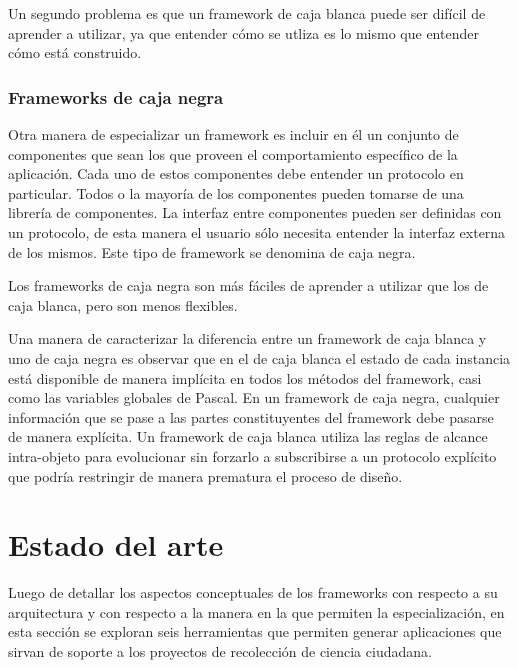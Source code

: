 	Un segundo problema es que un framework de caja blanca puede ser difícil de aprender a utilizar, ya que entender cómo se utliza es lo mismo que entender cómo está construido.\cite{johnson1988designing}
	
\subsubsection{Frameworks de caja negra}

	Otra manera de especializar un framework es incluir en él un conjunto de componentes que sean los que proveen el comportamiento específico de la aplicación. Cada uno de estos componentes debe entender un protocolo en particular. Todos o la mayoría de los componentes pueden tomarse de una librería de componentes. La interfaz entre componentes pueden ser definidas con un protocolo, de esta manera el usuario sólo necesita entender la interfaz externa de los mismos. Este tipo de framework se denomina de caja negra.
	
	Los frameworks de caja negra son más fáciles de aprender a utilizar que los de caja blanca, pero son menos flexibles. 
	
	Una manera de caracterizar la diferencia entre un framework de caja blanca y uno de caja negra es observar que en el de caja blanca el estado de cada instancia está disponible de manera implícita en todos los métodos del framework, casi como las variables globales de Pascal. En un framework de caja negra, cualquier información que se pase a las partes constituyentes del framework debe pasarse de manera explícita. Un framework de caja blanca utiliza las reglas de alcance intra-objeto para evolucionar sin forzarlo a subscribirse a un protocolo explícito que podría restringir de manera prematura el proceso de diseño.
 \cite{johnson1988designing}


\section{Estado del arte} \label{sec:estado_arte}
Luego de detallar los aspectos conceptuales de los frameworks con respecto a su arquitectura y con respecto a la manera en la que permiten la especialización, en esta sección se exploran seis herramientas que permiten generar aplicaciones que sirvan de soporte a los proyectos de recolección de ciencia ciudadana. 

